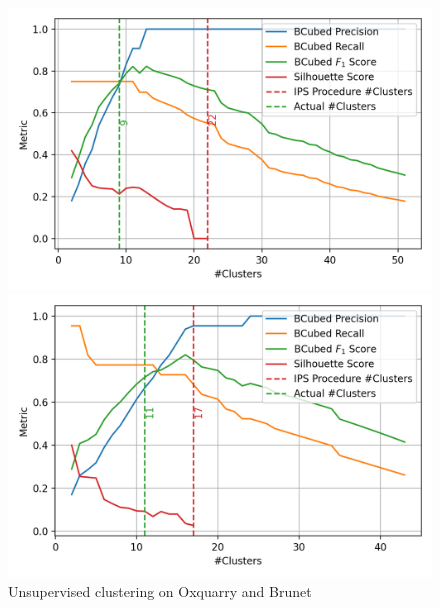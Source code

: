 \begin{figure}
  \caption{Unsupervised clustering on Oxquarry and Brunet}
  \label{fig:unsupervised_clustering_ob}

  \label{fig:unsupervised_clustering_oxquarry}
  \includegraphics[width=\linewidth]{img/unsupervised_clustering_oxquarry.png}

  \label{fig:unsupervised_clustering_brunet}
  \includegraphics[width=\linewidth]{img/unsupervised_clustering_brunet.png}
\end{figure}

